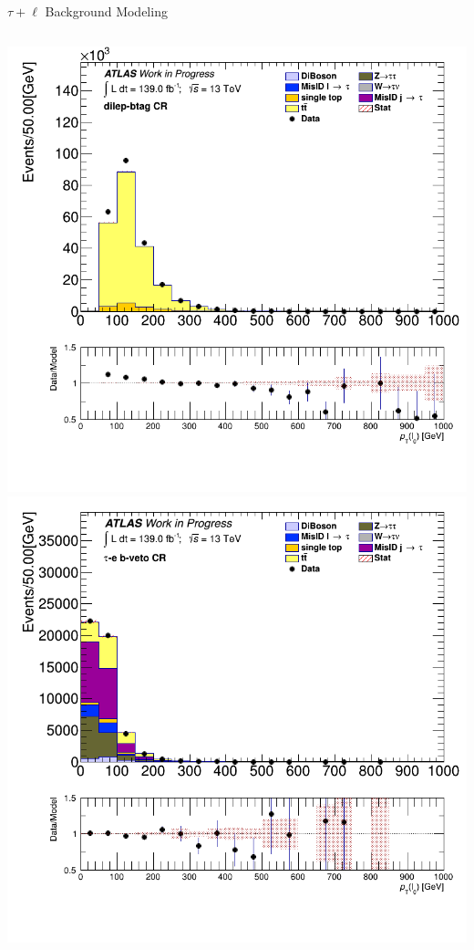 \documentclass[aspectratio=169,xcolor=table]{beamer}
\begin{document}
\begin{frame}[t]{$\tau+\ell$ Background Modeling}
\begin{columns}[t]
          \includegraphics[height=.45\textheight,keepaspectratio=true]{taulep_1p_3p/v09/lep_0_pt_DILEP_BTAG.png}
          \includegraphics[height=.45\textheight,keepaspectratio=true]{taulep_1p_3p/v09/lep_0_pt_TAUEL_BVETO.png}


\end{columns}
\end{frame}
\end{document}
